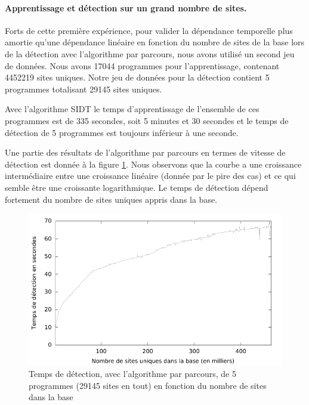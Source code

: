 \paragraph{Apprentissage et détection sur un grand nombre de sites.}
Forts de cette première expérience, pour valider la dépendance temporelle plus amortie qu'une dépendance linéaire en fonction du nombre de sites de la base lors de la détection avec l'algorithme par parcours, nous avons utilisé un second jeu de données.
Nous avons 17044 programmes pour l'apprentissage, contenant 4452219 sites uniques. Notre jeu de données pour la détection contient 5 programmes totalisant 29145 sites uniques.

Avec l'algorithme SIDT le temps d'apprentissage de l'ensemble de ces programmes est de 335 secondes, soit 5 minutes et 30 secondes et le temps de détection de 5 programmes est toujours inférieur à une seconde.

Une partie des résultats de l'algorithme par parcours en termes de vitesse de détection est donnée à la figure \ref{fig:scan-plus-gtsi}. Nous observons que la courbe a une croissance intermédiaire entre une croissance linéaire (donnée par le pire des cas) et ce qui semble être une croissante logarithmique.
Le temps de détection dépend fortement du nombre de sites uniques appris dans la base.

\begin{figure}[h]
\begin{center}
\includegraphics{supports/plots/plotScan-plus-GTSI.pdf}
\end{center}
\caption{Temps de détection, avec l'algorithme par parcours, de 5 programmes (29145 sites en tout) en fonction du nombre de sites dans la base}
\label{fig:scan-plus-gtsi}
\end{figure}

